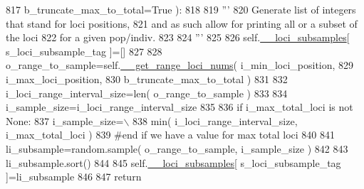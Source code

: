 \begin{DoxyCode}
817             b\_truncate\_max\_to\_total=\textcolor{keyword}{True} ):
818             
819         \textcolor{stringliteral}{'''}
820 \textcolor{stringliteral}{        Generate list of integers that stand for loci positions,}
821 \textcolor{stringliteral}{        and as such allow for printing all or a subset of the loci}
822 \textcolor{stringliteral}{        for a given pop/indiv.}
823 \textcolor{stringliteral}{}
824 \textcolor{stringliteral}{        '''}
825 
826         self.\hyperlink{classnegui_1_1genepopfilemanager_1_1GenepopFileManager_af867ba70728e8a3aaf0097ddd6399e28}{\_\_loci\_subsamples}[ s\_loci\_subsample\_tag ]=[]
827 
828         o\_range\_to\_sample=self.\hyperlink{classnegui_1_1genepopfilemanager_1_1GenepopFileManager_aaa92e1946fdacb522325a288e00eac71}{\_\_get\_range\_loci\_nums}( i\_min\_loci\_position, 
829                                                             i\_max\_loci\_position,
830                                                             b\_truncate\_max\_to\_total )
831         
832         i\_loci\_range\_interval\_size=len( o\_range\_to\_sample )
833 
834         i\_sample\_size=i\_loci\_range\_interval\_size 
835 
836         \textcolor{keywordflow}{if} i\_max\_total\_loci \textcolor{keywordflow}{is} \textcolor{keywordflow}{not} \textcolor{keywordtype}{None}:
837             i\_sample\_size=\(\backslash\)
838                     min( i\_loci\_range\_interval\_size, i\_max\_total\_loci ) 
839         \textcolor{comment}{#end if we have a value for max total loci }
840 
841         li\_subsample=random.sample( o\_range\_to\_sample, i\_sample\_size )
842 
843         li\_subsample.sort()
844 
845         self.\hyperlink{classnegui_1_1genepopfilemanager_1_1GenepopFileManager_af867ba70728e8a3aaf0097ddd6399e28}{\_\_loci\_subsamples}[ s\_loci\_subsample\_tag ]=li\_subsample
846 
847         \textcolor{keywordflow}{return}
\end{DoxyCode}
